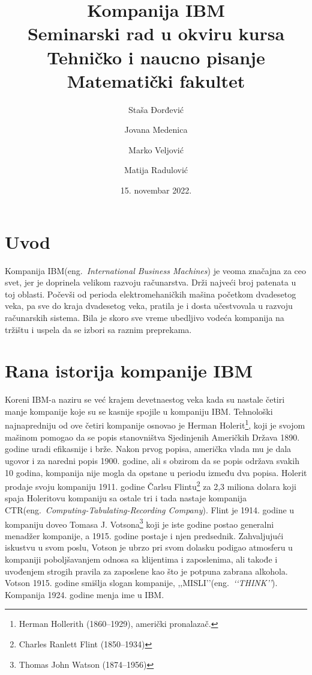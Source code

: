 \documentclass[a4paper]{article}
\title{Kompanija IBM \\
\normalsize Seminarski rad u okviru kursa\\ Tehničko i naucno pisanje
\\Matematički fakultet}
\author{Staša Đorđević \and
Jovana Medenica \and
Marko Veljović \and
Matija Radulović} %
\date{15. novembar 2022.} %
\begin{document}
\maketitle

\tableofcontents

\newpage
\section{Uvod}
Kompanija IBM(eng.~{\em International Business Machines}) je veoma značajna za ceo svet, jer je doprinela velikom razvoju računarstva. Drži najveći broj patenata u toj oblasti. Počevši od perioda elektromehaničkih mašina početkom dvadesetog veka, pa sve do kraja dvadesetog veka, pratila je i dosta učestvovala u razvoju računarskih sistema. Bila je skoro sve vreme ubedljivo vodeća kompanija na tržištu i uspela da se izbori sa raznim preprekama.

\section{Rana istorija kompanije IBM}
Koreni IBM-a naziru se već krajem devetnaestog veka kada su nastale četiri manje kompanije koje su se kasnije spojile u kompaniju IBM. Tehnološki najnapredniju od ove četiri kompanije osnovao je Herman Holerit\footnote[1]{Herman Hollerith (1860–1929), američki pronalazač.}, koji je svojom mašinom pomogao da se popis stanovništva Sjedinjenih Američkih Država 1890. godine uradi efikasnije i brže. Nakon prvog popisa, američka vlada mu je dala ugovor i za naredni popis 1900. godine, ali s obzirom da se popis održava svakih 10 godina, kompanija nije mogla da opstane u periodu između dva popisa. Holerit prodaje svoju kompaniju 1911. godine Čarlsu Flintu\footnote[2]{Charles Ranlett Flint (1850–1934)} za 2,3 miliona dolara koji spaja Holeritovu kompaniju sa ostale tri i tada nastaje kompanija CTR(eng.~{\em Computing-Tabulating-Recording Company}). Flint je 1914. godine u kompaniju doveo Tomasa J. Votsona\footnote[3]{Thomas John Watson (1874–1956)} koji je iste godine postao generalni menadžer kompanije, a 1915. godine postaje i njen predsednik. Zahvaljujući iskustvu u svom poslu, Votson je ubrzo pri svom dolasku podigao atmosferu u kompaniji poboljšavanjem odnosa sa klijentima i zaposlenima, ali takođe i uvođenjem strogih pravila za zaposlene kao što je potpuna zabrana alkohola. Votson 1915. godine smišlja slogan kompanije, ,,MISLI’’(eng.~{\em ‘‘THINK’’}). Kompanija 1924. godine menja ime u IBM\cite{p1}.
\end{document}
